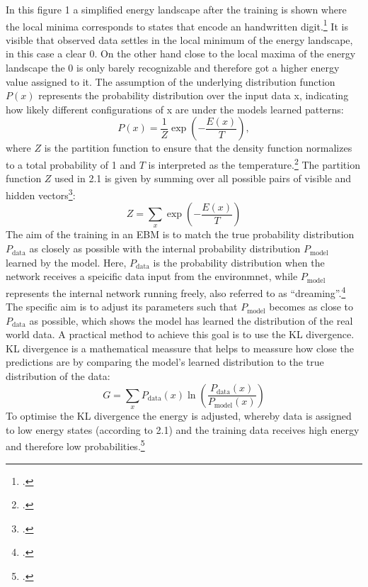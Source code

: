 In this figure 1 a simplified energy landscape after the training is shown where the local minima corresponds to states that encode an handwritten digit.\footcite[cf.][6]{huembeliPhysicsEnergybasedModels2022} It is visible that observed data settles in the local minimum of the energy landscape, in this case a clear 0. On the other hand close to the local maxima of the energy landscape the 0 is only barely recognizable and therefore got a higher energy value assigned to it.
The assumption of the underlying distribution function \( P(x) \) represents the probability distribution over the input data x,
indicating how likely different configurations of x are under the models learned patterns:
\begin{equation}
    P(x) = \frac{1}{Z} \exp\left(-\frac{E(x)}{T}\right),
\end{equation}
where \( Z \) is the partition function to ensure
that the density function normalizes to a total probability of 1 and \( T \) is interpreted as the temperature.\footcite[cf.][2-3]{huembeliPhysicsEnergybasedModels2022}
The partition function \( Z \) used in 2.1 is given by summing over all possible pairs of visible and hidden vectors\footcite[cf.][4]{hintonPracticalGuideTraining2012}:
\begin{equation}
    Z = \sum_x \exp\left(-\frac{E(x)}{T}\right)
    \label{partition_function}
\end{equation}
The aim of the training in an \ac{EBM} is to match the true probability distribution \( P_{\text{data}} \) as closely as possible with the internal probability distribution \( P_{\text{model}} \) learned by the model.
Here, \( P_{\text{data}} \) is the probability distribution when the network receives a speicific data input from the environmnet, while \( P_{\text{model}} \) represents the internal network running freely, also referred to as ``dreaming''.\footcite[cf.][154-155]{ackleyLearningAlgorithmBoltzmann1985}
The specific aim is to adjust its parameters such that \( P_{\text{model}} \)
becomes as close to \( P_{\text{data}} \) as possible, which shows the model has learned the distribution of the real world data.
A practical method to achieve this goal is to use the KL divergence. KL divergence is a mathematical meassure that helps to meassure how close the predictions are by comparing the model's learned distribution to the true distribution of the data:
\begin{equation}
    G = \sum_x P_{\text{data}}(x) \ln \left( \frac{P_{\text{data}}(x)}{P_{\text{model}}(x)} \right)
\end{equation}
To optimise the KL divergence the energy is adjusted, whereby data is assigned to low energy states (according to 2.1) and the training data receives high energy and therefore low probabilities.\footcite[cf.][2-3]{zhaiDeepStructuredEnergy2016}

